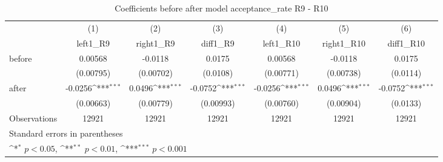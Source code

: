 \begin{table}[htbp]\centering
\def\sym#1{\ifmmode^{#1}\else\(^{#1}\)\fi}
\caption{Coefficients before after model acceptance\_rate R9 - R10}
\begin{tabular}{l*{6}{c}}
\hline\hline
                    &\multicolumn{1}{c}{(1)}&\multicolumn{1}{c}{(2)}&\multicolumn{1}{c}{(3)}&\multicolumn{1}{c}{(4)}&\multicolumn{1}{c}{(5)}&\multicolumn{1}{c}{(6)}\\
                    &\multicolumn{1}{c}{left1\_R9}&\multicolumn{1}{c}{right1\_R9}&\multicolumn{1}{c}{diff1\_R9}&\multicolumn{1}{c}{left1\_R10}&\multicolumn{1}{c}{right1\_R10}&\multicolumn{1}{c}{diff1\_R10}\\
\hline
before              &     0.00568         &     -0.0118         &      0.0175         &     0.00568         &     -0.0118         &      0.0175         \\
                    &   (0.00795)         &   (0.00702)         &    (0.0108)         &   (0.00771)         &   (0.00738)         &    (0.0114)         \\
[1em]
after               &     -0.0256\sym{***}&      0.0496\sym{***}&     -0.0752\sym{***}&     -0.0256\sym{***}&      0.0496\sym{***}&     -0.0752\sym{***}\\
                    &   (0.00663)         &   (0.00779)         &   (0.00993)         &   (0.00760)         &   (0.00904)         &    (0.0133)         \\
\hline
Observations        &       12921         &       12921         &       12921         &       12921         &       12921         &       12921         \\
\hline\hline
\multicolumn{7}{l}{\footnotesize Standard errors in parentheses}\\
\multicolumn{7}{l}{\footnotesize \sym{*} \(p<0.05\), \sym{**} \(p<0.01\), \sym{***} \(p<0.001\)}\\
\end{tabular}
\end{table}
